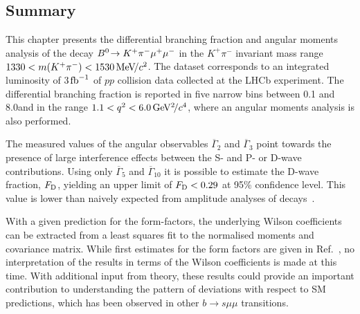 \subsection{Summary}

This chapter presents the differential branching fraction and angular moments analysis of the decay ${B}^0\!\rightarrow K^{+}\pi^{-}\mu^{+}\mu^{-}$ in the $K^{+}\pi^{-}$ invariant mass range $1330<m({{K}^+}{{\pi}^-})<1530\mathrm{\,Me\kern -0.1em V\!/}c^{2}$.  The dataset corresponds to an integrated luminosity of 3$\ensuremath{\mbox{\,fb}^{-1}}\xspace$ of $pp$ collision data collected at the LHCb experiment.  The differential branching fraction is reported in five narrow \qsq bins between 0.1 and 8.0\gevgevcccc and in the range $1.1<{q^2}<6.0{\mathrm{\,Ge\kern -0.1em V^2\!/}c^4}$, where an angular moments analysis is also performed.

The measured values of the angular observables $\overline{\Gamma}_{2}$ and $\overline{\Gamma}_{3}$ point towards the presence of large interference effects between the S- and P- or D-wave contributions. Using only $\overline{\Gamma}_{5}$ and $\overline{\Gamma}_{10}$ it is possible to estimate the D-wave fraction, $F_{\rm D}$,  yielding an upper limit of $F_{\rm D}<0.29$ at 95\% confidence level. This value is lower than naively expected from amplitude analyses of \BdToJPsiKpi decays~\cite{belle-z-paper}.

With a given prediction for the form-factors, the underlying Wilson coefficients can be extracted from a least squares fit to the normalised moments and covariance matrix. While first estimates for the form factors are given in Ref.~\cite{lu-wang}, no interpretation of the results in terms of the Wilson coefficients is made at this time.  With additional input from theory, these results could provide an important contribution to understanding the pattern of deviations with respect to SM predictions, which has been observed in other $b\to s\mu\mu$ transitions.